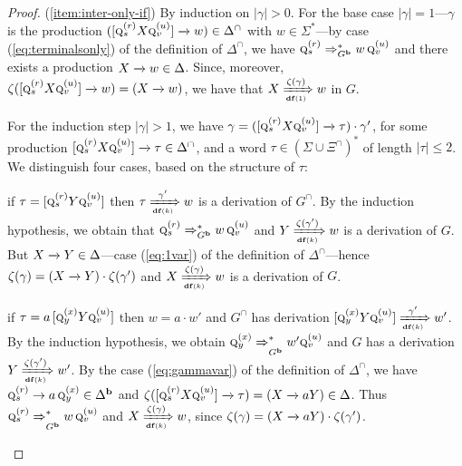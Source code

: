 \documentclass[final]{llncs}
\newcommand{\arrow}[2]{\xrightarrow{{\scriptscriptstyle #1}}}
\def\len#1{{\vert{#1}\vert}}
\def\prod{\Delta}
\def\pat{{\mathbf{b}}}
\def\df#1{\scriptscriptstyle\mathbf{df}(#1)}
\def\Vars{\ensuremath{\Xi}}
\begin{document}
\begin{proof}
(\ref{item:inter-only-if}) By induction on $\len{\gamma} > 0$. For the base
  case $\len{\gamma}=1$---$\gamma$ is the production
  $([\textsc{q}_{s}^{(r)} X \textsc{q}_{v}^{(u)}] \arrow{}{} w) \in
  \Delta^\cap$ with \(w\in\Sigma^*\)---by case (\ref{eq:terminalsonly}) of the definition
  of $\Delta^\cap$, we have
  $\textsc{q}_{s}^{(r)}\Rightarrow_{G^{\pat}}^* w\, \textsc{q}_{v}^{(u)}$
  and there exists a production $X \arrow{}{} w \in \Delta$. Since,
  moreover, $\zeta([\textsc{q}_{s}^{(r)} X \textsc{q}_{v}^{(u)}]
  \arrow{}{} w) = (X \arrow{}{} w)$, we have that $X
  \xRightarrow[\df{1}]{\zeta(\gamma)} w$ in $G$.

  For the induction step $\len{\gamma} > 1$, we have $\gamma =
  ([\textsc{q}_{s}^{(r)} X \textsc{q}_{v}^{(u)}] \arrow{}{} \tau) \cdot
  \gamma'$, for some production $[\textsc{q}_{s}^{(r)} X
    \textsc{q}_{v}^{(u)}] \arrow{}{} \tau \in \Delta^\cap$, and a word
  $\tau \in (\Sigma \cup \Vars^\cap)^*$ of length $\len{\tau} \leq
  2$. We distinguish four cases, based on the structure of $\tau$:
  \begin{compactenum}
  \item if $\tau = [\textsc{q}_{s}^{(r)} Y \textsc{q}_{v}^{(u)}]$ then $\tau
    \xRightarrow[\df{k}]{\gamma'} w$ is a derivation of $G^\cap$. By
    the induction hypothesis, we obtain that
    $\textsc{q}_{s}^{(r)}\Rightarrow_{G^{\pat}}^* w\,\textsc{q}_{v}^{(u)}$
    and $Y \xRightarrow[\df{k}]{\zeta(\gamma')} w$ is a derivation of
    $G$. But \(X \arrow{}{} Y\in\prod\)---case
    (\ref{eq:1var}) of the definition of $\Delta^\cap$---hence 
    $\zeta(\gamma) = (X \arrow{}{} Y) \cdot \zeta(\gamma')$ and
    $X \xRightarrow[\df{k}]{\zeta(\gamma)} w$ is a derivation of $G$.

  \item if $\tau = a \, [\textsc{q}^{(x)}_{y} Y
    \textsc{q}^{(u)}_v]$ then $w = a \cdot w'$ and $G^\cap$ has
    derivation $[\textsc{q}^{(x)}_{y} Y \textsc{q}^{(u)}_v]
    \xRightarrow[\df{k}]{\gamma'} w'$. By the induction hypothesis, we
    obtain $\textsc{q}^{(x)}_{y} \xRightarrow{}_{G^\pat}^* w'
    \textsc{q}^{(u)}_{v}$ and $G$ has a derivation $Y
    \xRightarrow[\df{k}]{\zeta(\gamma')} w'$. By the case
    (\ref{eq:gammavar}) of the definition of $\Delta^\cap$, we have
    $\textsc{q}^{(r)}_{s}\rightarrow a \, \textsc{q}^{(x)}_{y}
    \in \prod^{\pat}$ and $\zeta([\textsc{q}_{s}^{(r)} X
      \textsc{q}_{v}^{(u)}] \arrow{}{} \tau) = (X \arrow{}{} a Y)
    \in \Delta$. Thus $\textsc{q}^{(r)}_{s} \xRightarrow{}_{G^\pat}^*
    w\, \textsc{q}^{(u)}_{v}$ and $X \xRightarrow[\df{k}]{\zeta(\gamma)}
    w$, since $\zeta(\gamma) = (X \arrow{}{} a Y) \cdot
    \zeta(\gamma')$.


\end{compactenum}
\end{proof}
\end{document}
